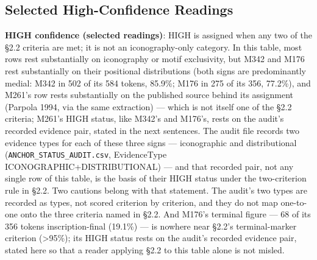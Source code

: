 \documentclass[11pt]{article}
\begin{document}
\subsection{Selected High-Confidence
Readings}\label{selected-high-confidence-readings}

\textbf{HIGH confidence (selected readings)}: HIGH is assigned when any two of the §2.2 criteria are met; it is not an iconography-only category. In this table, most rows rest substantially on iconography or motif exclusivity, but M342 and M176 rest substantially on their positional distributions (both signs are predominantly medial: M342 in 502 of its 584 tokens, 85.9\%; M176 in 275 of its 356, 77.2\%), and M261's row rests substantially on the published source behind its assignment (Parpola 1994, via the same extraction) --- which is not itself one of the §2.2 criteria; M261's HIGH status, like M342's and M176's, rests on the audit's recorded evidence pair, stated in the next sentences. The audit file records two evidence types for each of these three signs --- iconographic and distributional (\texttt{ANCHOR\_STATUS\_AUDIT.csv}, EvidenceType ICONOGRAPHIC+DISTRIBUTIONAL) --- and that recorded pair, not any single row of this table, is the basis of their HIGH status under the two-criterion rule in §2.2. Two cautions belong with that statement. The audit's two types are recorded as types, not scored criterion by criterion, and they do not map one-to-one onto the three criteria named in §2.2. And M176's terminal figure --- 68 of its 356 tokens inscription-final (19.1\%) --- is nowhere near §2.2's terminal-marker criterion (\textgreater95\%); its HIGH status rests on the audit's recorded evidence pair, stated here so that a reader applying §2.2 to this table alone is not misled.
\end{document}
